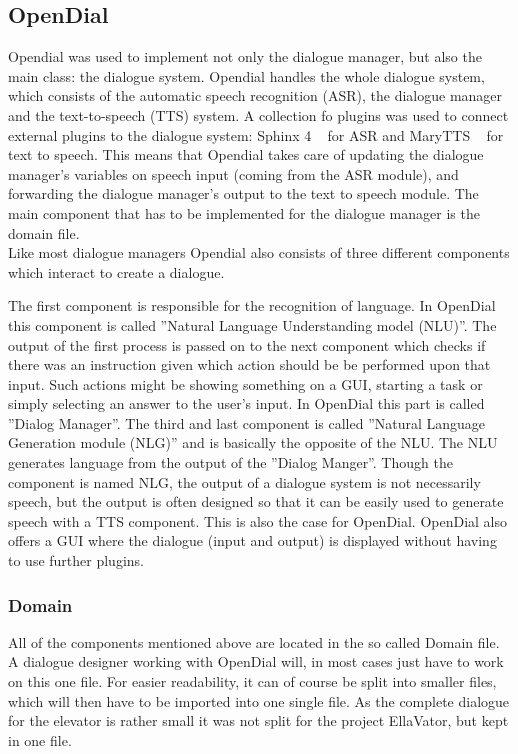 \documentclass[a4paper, 12pt]{article}
\begin{document}
\subsection{OpenDial}
\label{sec:opendial}
Opendial was used to implement not only the dialogue manager,  but also the main class: the dialogue system. 
Opendial handles the whole dialogue system, which consists of the automatic speech recognition (ASR), the dialogue manager and the text-to-speech (TTS) system. 
A collection fo plugins was used to connect external plugins to the dialogue system: Sphinx 4 ~\cite{Walker:2004:SFO:1698193} for ASR and MaryTTS ~\cite{marytts} for text to speech. 
This means that Opendial takes care of updating the dialogue manager's variables on speech input (coming from the ASR module), and forwarding the dialogue manager's output to the text to speech module. 
The main component that has to be implemented for the dialogue manager is the domain file. \\
\indent Like most dialogue managers Opendial also consists of three different components which interact to create a dialogue. 

The first component is responsible for the recognition of language. 
In OpenDial this component is called ”Natural Language Understanding model (NLU)”. 
The output of the first process is passed on to the next component which checks if there was an instruction given which action should be be performed upon that input. 
Such actions might be showing something on a GUI, starting a task or simply selecting an answer to the user's input. 
In OpenDial this part is called ”Dialog Manager”.
The third and last component is called ”Natural Language Generation module (NLG)” and is basically the opposite of the NLU. 
The NLU generates language from the output of the ”Dialog Manger”. 
Though the component is named NLG, the output of a dialogue system is not necessarily speech, but the output is often designed so that it can be easily used to generate speech with a TTS component. 
This is also the case for OpenDial. 
OpenDial also offers a GUI where the dialogue (input and output) is displayed without having to use further plugins.

\subsubsection{Domain}

All of the components mentioned above are located in the so called Domain file.
A dialogue designer working with OpenDial will, in most cases just have to work on this one file. 
For easier readability, it can of course be split into smaller files, which will then have to be imported into one single file. 
As the complete dialogue for the elevator is rather small it was not split for the project EllaVator, but kept in one file. \newline
\end{document}
